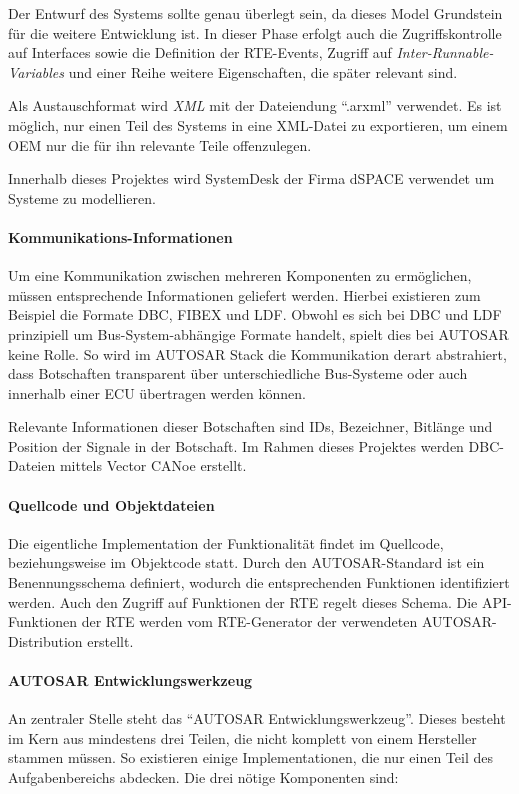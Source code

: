 \documentclass[
  a4paper,					    %
  twoside,
  DIV=calc,     				%
  bibliography=totoc,
  cleardoublepage=empty,
  ngerman,     					%
  final       					%
]{scrbook}
\begin{document}
Der Entwurf des Systems sollte genau überlegt sein, da dieses Model Grundstein für die weitere Entwicklung ist. In dieser Phase erfolgt auch die Zugriffskontrolle auf Interfaces sowie die Definition der RTE-Events, Zugriff auf \emph{Inter-Runnable-Variables} und einer Reihe weitere Eigenschaften, die später relevant sind.

Als Austauschformat wird \emph{XML} mit der Dateiendung "`.arxml"' verwendet. Es ist möglich, nur einen Teil des Systems in eine XML-Datei zu exportieren, um einem OEM nur die für ihn relevante Teile offenzulegen.

Innerhalb dieses Projektes wird SystemDesk der Firma dSPACE verwendet um Systeme zu modellieren.

\paragraph{Kommunikations-Informationen}
Um eine Kommunikation zwischen mehreren Komponenten zu ermöglichen, müssen entsprechende Informationen geliefert werden. Hierbei existieren zum Beispiel die Formate DBC, FIBEX und LDF. Obwohl es sich bei DBC und LDF prinzipiell um Bus-System-abhängige Formate handelt, spielt dies bei AUTOSAR keine Rolle. So wird im AUTOSAR Stack die Kommunikation derart abstrahiert, dass Botschaften transparent über unterschiedliche Bus-Systeme oder auch innerhalb einer ECU übertragen werden können.

Relevante Informationen dieser Botschaften sind IDs, Bezeichner, Bitlänge und Position der Signale in der Botschaft. Im Rahmen dieses Projektes werden DBC-Dateien mittels Vector CANoe erstellt.

\paragraph{Quellcode und Objektdateien}
Die eigentliche Implementation der Funktionalität findet im Quellcode, beziehungsweise im Objektcode statt. Durch den AUTOSAR-Standard ist ein Benennungsschema definiert, wodurch die entsprechenden Funktionen identifiziert werden. Auch den Zugriff auf Funktionen der RTE regelt dieses Schema. Die API-Funktionen der RTE werden vom RTE-Generator der verwendeten AUTOSAR-Distribution erstellt.

\paragraph{AUTOSAR Entwicklungswerkzeug}
An zentraler Stelle steht das "`AUTOSAR Entwicklungswerkzeug"'. Dieses besteht im Kern aus mindestens drei Teilen, die nicht komplett von einem Hersteller stammen müssen. So existieren einige Implementationen, die nur einen Teil des Aufgabenbereichs abdecken. Die drei nötige Komponenten sind:
\end{document}
